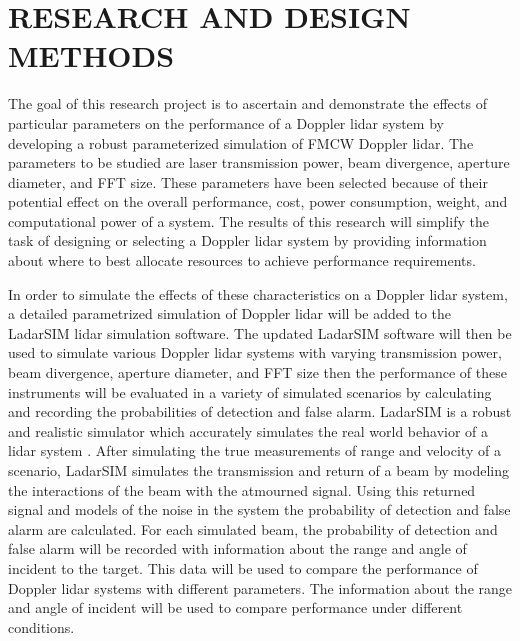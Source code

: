 %
%
%
%

\chapter{RESEARCH AND DESIGN METHODS}
The goal of this research project is to ascertain and demonstrate the effects
of particular parameters on the performance of a Doppler lidar system by 
developing a robust parameterized simulation of FMCW Doppler lidar.
The parameters to be studied are laser transmission power, beam divergence,
aperture diameter, and FFT size.
These parameters have been selected because of their potential effect on
the overall performance, cost, power consumption, weight, and computational
power of a system.
The results of this research will simplify the task of designing or selecting
a Doppler lidar system by providing information about where to best allocate
resources to achieve performance requirements.

In order to simulate the effects of these characteristics on a Doppler lidar
system, a detailed parametrized simulation of Doppler lidar will be added
to the LadarSIM lidar simulation software.
The updated LadarSIM software will then be used to simulate various Doppler
lidar systems with varying transmission power, beam divergence, aperture
diameter, and FFT size then the performance of these instruments will be
evaluated in a variety of simulated scenarios by calculating and recording
the probabilities of detection and false alarm.
LadarSIM is a robust and realistic simulator which accurately simulates
the real world behavior of a lidar system \cite{budgeLeishman,neilsenBudge}.
After simulating the true measurements of range and velocity of a scenario,
LadarSIM simulates the transmission and return of a beam by modeling the
interactions of the beam with the atmourned signal.
Using this returned signal and models of the noise in the system the probability
of detection and false alarm are calculated.
For each simulated beam, the probability of detection and false alarm will
be recorded with information about the range and angle of incident to the
target.
This data will be used to compare the performance of Doppler lidar systems
with different parameters.
The information about the range and angle of incident will be used to compare
performance under different conditions.

